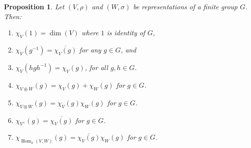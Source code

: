 \documentclass[12pt]{article}
\theoremstyle{plain}
\newtheorem{proposition}[theorem]{Proposition}
\theoremstyle{definition}
\theoremstyle{remark}
\numberwithin{equation}{section}
\begin{document}
\begin{proposition}
Let $(V,\rho)$ and $(W,\sigma)$ be representations of a finite group
$G$.
Then:
\begin{enumerate}
\item $\chi_V(1)=\dim(V)$ where $1$ is identity of $G$,
\item $\chi_V(g^{-1}) = \overline{\chi_V(g)}$
for any $g \in G$, and
\item $\chi_V(hgh^{-1})=\chi_V(g)$, for all $g,h \in G$.
\item
$\displaystyle
\chi_{V \oplus W}(g) = \chi_V(g) + \chi_W(g)$ for $g \in G$.
\item
$\displaystyle
\chi_{V \otimes W}(g) = \chi_V(g)\chi_W(g)$ for $g \in G$.
\item
$\displaystyle
\chi_{V^\vee}(g) =  \overline{\chi_V(g)}$ for $g \in G$.
\item
$\displaystyle
\chi_{\operatorname{Hom}_k(V,W)}(g) = \overline{\chi_V(g)} \chi_W(g)$ for $g \in G$.
\end{enumerate}
\end{proposition}
\end{document}
